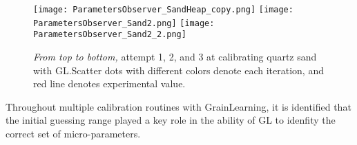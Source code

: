 \begin{figure}[H]
    \centering
    \texttt{[image: ParametersObserver\_SandHeap\_copy.png]}
    \texttt{[image: ParametersObserver\_Sand2.png]}
    \texttt{[image: ParametersObserver\_Sand2\_2.png]}
    \caption{\textit{From top to bottom,} attempt 1, 2, and 3 at calibrating quartz sand with GL.\@ Scatter dots with different colors denote each iteration, and red line denotes experimental value.}\label{fig:Quartz}
\end{figure}



Throughout multiple calibration routines with GrainLearning, it is identified that the initial guessing range played a key role in the ability of GL to idenfity the correct set of micro-parameters. 


